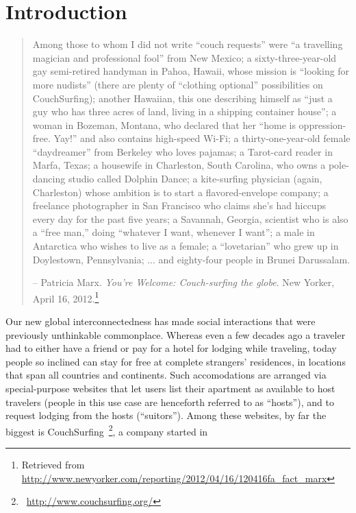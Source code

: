 \section{Introduction}

\begin{quotation}
Among those to whom I did not write “couch requests” were “a travelling magician and professional fool” from New Mexico; a sixty-three-year-old gay semi-retired handyman in Pahoa, Hawaii, whose mission is “looking for more nudists” (there are plenty of “clothing optional” possibilities on CouchSurfing); another Hawaiian, this one describing himself as “just a guy who has three acres of land, living in a shipping container house”; a woman in Bozeman, Montana, who declared that her “home is oppression-free. Yay!” and also contains high-speed Wi-Fi; a thirty-one-year-old female “daydreamer” from Berkeley who loves pajamas; a Tarot-card reader in Marfa, Texas; a housewife in Charleston, South Carolina, who owns a pole-dancing studio called Dolphin Dance; a kite-surfing physician (again, Charleston) whose ambition is to start a flavored-envelope company; a freelance photographer in San Francisco who claims she’s had hiccups every day for the past five years; a Savannah, Georgia, scientist who is also a “free man,” doing “whatever I want, whenever I want”; a male in Antarctica who wishes to live as a female; a “lovetarian” who grew up in Doylestown, Pennsylvania; ... and eighty-four people in Brunei Darussalam.

-- Patricia Marx. \emph{You're Welcome: Couch-surfing the globe}. New Yorker, April 16, 2012.\footnote{Retrieved from \url{http://www.newyorker.com/reporting/2012/04/16/120416fa_fact_marx}}
\end{quotation}

Our new global interconnectedness has made social interactions that were previously unthinkable commonplace.
Whereas even a few decades ago a traveler had to either have a friend or pay for a hotel for lodging while traveling, today people so inclined can stay for free at complete strangers' residences, in locations that span all countries and continents.
Such accomodations are arranged via special-purpose websites that let users list their apartment as available to host travelers (people in this use case are henceforth referred to as ``hosts''), and to request lodging from the hosts (``suitors'').
Among these websites, by far the biggest is CouchSurfing~\footnote{~\url{http://www.couchsurfing.org/}}, a company started in 

